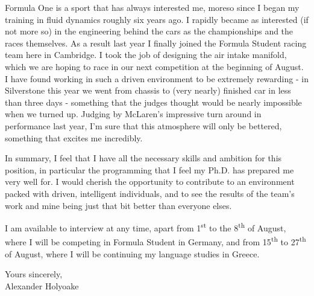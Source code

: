\documentclass[a4paper,10pt]{article}
\begin{document}
Formula One is a sport that has always interested me, moreso since I began my training in fluid dynamics roughly six years ago. I rapidly became as interested (if not more so) in the engineering behind the cars as the championships and the races themselves. As a result last year I finally joined the Formula Student racing team here in Cambridge. I took the job of designing the air intake manifold, which we are hoping to race in our next competition at the beginning of August. I have found working in such a driven environment to be extremely rewarding - in Silverstone this year we went from chassis to (very nearly) finished car in less than three days - something that the judges thought would be nearly impossible when we turned up. Judging by McLaren's impressive turn around in performance last year, I'm sure that this atmosphere will only be bettered, something that excites me incredibly.

In summary, I feel that I have all the necessary skills and ambition for this position, in particular the programming that I feel my Ph.D. has prepared me very well for. I would cherish the opportunity to contribute to an environment packed with driven, intelligent individuals, and to see the results of the team's work and mine being just that bit better than everyone elses.

I am available to interview at any time, apart from 1\textsuperscript{st} to the 8\textsuperscript{th} of August, where I will be competing in Formula Student in Germany, and from 15\textsuperscript{th} to 27\textsuperscript{th} of August, where I will be continuing my language studies in Greece.

\noindent
Yours sincerely,\\ 

Alexander Holyoake   
\end{document}
